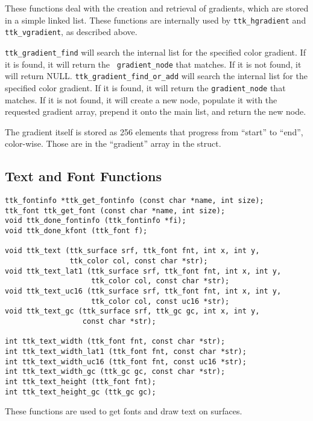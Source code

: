 \documentclass[12pt,letterpaper]{report}
\let\ttt\tt
\def\tt{\def\_{{\ttt\char`\_}}\ttt}
\begin{document}
These functions deal with the creation and retrieval of gradients, which are 
stored in a simple linked list.  These functions are internally used by
{\tt ttk_hgradient} and {\tt ttk_vgradient}, as described above.

{\tt ttk_gradient_find} will search the internal list for the
specified color gradient.  If it is found, it will return the {\tt
gradient_node} that matches.  If it is not found, it will return
NULL.
{\tt ttk_gradient_find_or_add} will search the internal list for
the specified color gradient.  If it is found, it will return the
{\tt gradient_node} that matches.  If it is not found, it will
create a new node, populate it with the requested gradient array,
prepend it onto the main list, and return the new node.

The gradient itself is stored as 256 elements that progress from
``start'' to ``end'', color-wise.  Those are in the ``gradient''
array in the struct.

\subsection{Text and Font Functions}
\begin{verbatim}
ttk_fontinfo *ttk_get_fontinfo (const char *name, int size);
ttk_font ttk_get_font (const char *name, int size);
void ttk_done_fontinfo (ttk_fontinfo *fi);
void ttk_done_kfont (ttk_font f);

void ttk_text (ttk_surface srf, ttk_font fnt, int x, int y,
               ttk_color col, const char *str);
void ttk_text_lat1 (ttk_surface srf, ttk_font fnt, int x, int y,
                    ttk_color col, const char *str);
void ttk_text_uc16 (ttk_surface srf, ttk_font fnt, int x, int y,
                    ttk_color col, const uc16 *str);
void ttk_text_gc (ttk_surface srf, ttk_gc gc, int x, int y,
                  const char *str);

int ttk_text_width (ttk_font fnt, const char *str);
int ttk_text_width_lat1 (ttk_font fnt, const char *str);
int ttk_text_width_uc16 (ttk_font fnt, const uc16 *str);
int ttk_text_width_gc (ttk_gc gc, const char *str);
int ttk_text_height (ttk_font fnt);
int ttk_text_height_gc (ttk_gc gc);
\end{verbatim}

These functions are used to get fonts and draw text on surfaces.
\end{document}
